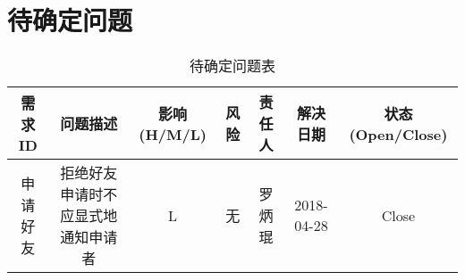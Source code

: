 \chapter{待确定问题}
\begin{table}[htbp]
\centering
\caption{待确定问题表} \label{tab:tbd_problems}
\begin{tabular}{|c|c|c|c|c|c|c|}
    \hline
    需求ID & 问题描述 & 影响(H/M/L) & 风险 & 责任人 & 解决日期 & 状态(Open/Close) \\
    \hline
    申请好友 & 拒绝好友申请时不应显式地通知申请者 & L & 无 & 罗炳琨 & 2018-04-28 & Close\\
    \hline
\end{tabular}
\end{table}
